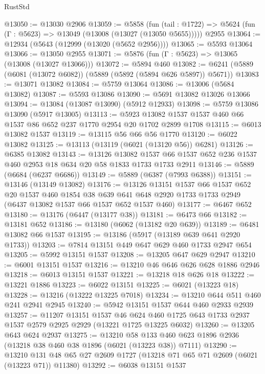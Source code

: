 \begin{lexlean}{RustStd}
\begin{coremodule}
@13050 := @13030 @2906
@13059 := @5858
    (fun (tail : @1722) => @5624 (fun (Γ : @5623) => @13049 (@13008 (@13027 (@13050 @5655)))))
    @2955
@13064 := @12934 (@5643 (@12999 (@13020 (@5652 @2956))))
@13065 := @5593 @13064
@13066 := @13050 @2955
@13071 := @5876 (fun (Γ : @5623) => @13065 (@13008 (@13027 @13066)))
@13072 := @5894 @460
@13082 := @6241 (@5889 (@6081 (@13072 @6082)) (@5889 (@5892 (@5894 @626 @5897)) @5671))
@13083 := @13071 @13082
@13084 := @5759 @13064
@13086 := @13006 (@5684 @13082)
@13087 := @5593 @13086
@13090 := @5691 @13082 @13026 @13066
@13094 := @13084 (@13087 @13090) (@5912 @12933)
@13098 := @5759 @13086 @13090 (@5917 @13005)
@13113 := @5923 @13082 @1537 @1537 @460 @66 @1537 @86 @652 @237 @1770 @2954 @20 @1702 @2899 @1708
@13115 := @6013 @13082 @1537
@13119 := @13115 @56 @66 @56 @1770
@13120 := @6022 @13082
@13125 := @13113 (@13119 (@6021 (@13120 @56)) @6281)
@13126 := @6385 @13082
@13143 := @13126
    @13082
    @1537
    @66
    @1537
    @652
    @236
    @1537
    @460
    @2953
    @18
    @634
    @20
    @58
    @1833
    @1733
    @1733
    @2911
@13146 := @5889 (@6684 (@6237 @6686))
@13149 := @5889 (@6387 (@7993 @6388))
@13151 := @13146 (@13149 @13082)
@13176 := @13126
    @13151
    @1537
    @66
    @1537
    @652
    @20
    @1537
    @460
    @1854
    @38
    @639
    @641
    @648
    @2920
    @1733
    @1733
    @2949
    (@6437 @13082 @1537 @66 @1537 @652 @1537 @460)
@13177 := @6467 @652
@13180 := @13176 (@6447 (@13177 @38))
@13181 := @6473 @66
@13182 := @13181 @652
@13186 := @13180 (@6062 (@13182 @20 @639))
@13189 := @6481 @13082 @66 @1537
@13195 := @13186 (@5917 (@13189 @639 @641 @2920 @1733))
@13203 := @7814 @13151 @449 @647 @629 @460 @1733 @2947 @654
@13205 := @5992 @13151 @1537
@13208 := @13205 @647 @629 @2947
@13210 := @6001 @13151 @1537
@13216 := @13210 @46 @646 @626 @628 @1886 @2946
@13218 := @6013 @13151 @1537
@13221 := @13218 @18 @626 @18
@13222 := @13221 @1886
@13223 := @6022 @13151
@13225 := @6021 (@13223 @18)
@13228 := @13216 (@13222 @13225 @7018)
@13234 := @13210 @644 @511 @460 @241 @2941 @2945
@13240 := @5942 @13151 @1537 @644 @460 @2933 @2939
@13257 := @11207
    @13151
    @1537
    @46
    @624
    @460
    @1725
    @643
    @1733
    @2937
    @1537
    @2579
    @2925
    @2929
    (@13221 @1725 @13225 @6032)
@13260 := @13205 @643 @624 @2937
@13275 := @13210
    @58
    @133
    @460
    @623
    @1896
    @2936
    (@13218 @38 @460 @38 @1896 (@6021 (@13223 @38)) @7111)
@13290 := @13210 @131 @48 @65 @27 @2609 @1727 (@13218 @71 @65 @71 @2609 (@6021 (@13223 @71)) @11380)
@13292 := @6038 @13151 @1537

\end{coremodule}
\end{lexlean}
